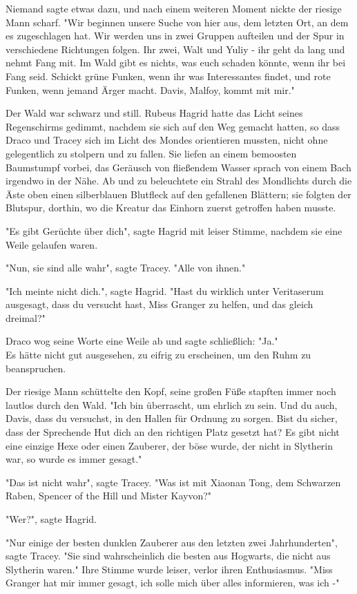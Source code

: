 {Niemand sagte etwas dazu, und nach einem weiteren Moment nickte der riesige Mann scharf. "Wir beginnen unsere Suche von hier aus, dem letzten Ort, an dem es zugeschlagen hat. Wir werden uns in zwei Gruppen aufteilen und der Spur in verschiedene Richtungen folgen. Ihr zwei, Walt und Yuliy - ihr geht da lang und nehmt Fang mit. Im Wald gibt es nichts, was euch schaden könnte, wenn ihr bei Fang seid. Schickt grüne Funken, wenn ihr was Interessantes findet, und rote Funken, wenn jemand Ärger macht. Davis, Malfoy, kommt mit mir."

Der Wald war schwarz und still. Rubeus Hagrid hatte das Licht seines Regenschirms gedimmt, nachdem sie sich auf den Weg gemacht hatten, so dass Draco und Tracey sich im Licht des Mondes orientieren mussten, nicht ohne gelegentlich zu stolpern und zu fallen. Sie liefen an einem bemoosten Baumstumpf vorbei, das Geräusch von fließendem Wasser sprach von einem Bach irgendwo in der Nähe. Ab und zu beleuchtete ein Strahl des Mondlichts durch die Äste oben einen silberblauen Blutfleck auf den gefallenen Blättern; sie folgten der Blutspur, dorthin, wo die Kreatur das Einhorn zuerst getroffen haben musste.

"Es gibt Gerüchte über dich", sagte Hagrid mit leiser Stimme, nachdem sie eine Weile gelaufen waren.

"Nun, sie sind alle wahr", sagte Tracey. "Alle von ihnen."

"Ich meinte nicht dich.", sagte Hagrid. "Hast du wirklich unter Veritaserum ausgesagt, dass du versucht hast, Miss Granger zu helfen, und das gleich dreimal?"

Draco wog seine Worte eine Weile ab und sagte schließlich: "Ja."\\ Es hätte nicht gut ausgesehen, zu eifrig zu erscheinen, um den Ruhm zu beanspruchen.

Der riesige Mann schüttelte den Kopf, seine großen Füße stapften immer noch lautlos durch den Wald. "Ich bin überrascht, um ehrlich zu sein. Und du auch, Davis, dass du versuchst, in den Hallen für Ordnung zu sorgen. Bist du sicher, dass der Sprechende Hut dich an den richtigen Platz gesetzt hat? Es gibt nicht eine einzige Hexe oder einen Zauberer, der böse wurde, der nicht in Slytherin war, so wurde es immer gesagt."

"Das ist nicht wahr", sagte Tracey. "Was ist mit Xiaonan Tong, dem Schwarzen Raben, Spencer of the Hill und Mister Kayvon?"

"Wer?", sagte Hagrid.

"Nur einige der besten dunklen Zauberer aus den letzten zwei Jahrhunderten", sagte Tracey. "Sie sind wahrscheinlich die besten aus Hogwarts, die nicht aus Slytherin waren." Ihre Stimme wurde leiser, verlor ihren Enthusiasmus. "Miss Granger hat mir immer gesagt, ich solle mich über alles informieren, was ich -"

}
